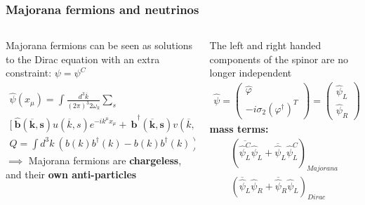 \documentclass{beamer}
\begin{document}
	\begin{frame}
		\frametitle{Majorana fermions and neutrinos}
		\begin{columns}[c] %
			
			\begin{column}{.45\textwidth} %
			{\footnotesize Majorana fermions can be seen as solutions to the Dirac equation with an extra constraint:
			$\psi = \psi^C$				
			}
			
			{\tiny
			\begin{eqnarray*}
			\hat{\psi}(x_{\mu}) = \int \frac{d^3 \overline{k}}{(2\pi)^3 2 \omega_k} \sum_s & \\
			\bigg[\ \boldsymbol{\hat{b}(\overline{k},s)}u(\overline{k},s)e^{-ik^{\mu}x_{\mu}}
			 + \ \boldsymbol{\hat{b}^{\dagger}(\overline{k},s)}v(\overline{k},s)e^{+ik^{\mu}x_{\mu}} \bigg] & \\
			 Q = \int d^3k \  \left(b(k)b^{\dagger}(k) - b(k)b^{\dagger}(k)\right) = 0
			\end{eqnarray*}
			}
			{\footnotesize $\implies$ Majorana fermions are \textbf{chargeless}, and their \textbf{own anti-particles}}
			\end{column}
			\hspace{25pt}
			\vrule{}
			\hspace{15pt}
			\begin{column}{.5\textwidth} %
			{\footnotesize The left and right handed components of the spinor are no longer independent}
			\begin{eqnarray*}
			\hat{\psi} = \begin{pmatrix}
			\hat{\varphi} \\
			-i\sigma_2(\varphi^{\dagger})^T
			\end{pmatrix} =  \begin{pmatrix}
			\hat{\psi}_L \\
			\hat{\psi}_R
			\end{pmatrix}
			\end{eqnarray*}
			{\footnotesize \textbf{mass terms:}}
			\begin{eqnarray*}
			\left( \overline{\hat{\psi}^C_L} \hat{\psi}_L + \overline{\hat{\psi}}_L \hat{\psi}^C_L \right)_{Majorana} \\
			 \left(\overline{\hat{\psi}}_L \hat{\psi}_R + \overline{\hat{\psi}}_R \hat{\psi}_L\right)_{Dirac}
			\end{eqnarray*}
			\end{column}
		\end{columns}
	\end{frame}	
	
\end{document}
